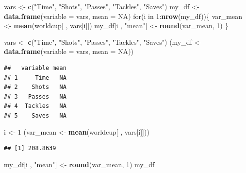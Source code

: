 \documentclass[]{book}
\makeatletter
\newenvironment{Shaded}{\begin{snugshade}}{\end{snugshade}}
\newcommand{\KeywordTok}[1]{\textcolor[rgb]{0.13,0.29,0.53}{\textbf{{#1}}}}
\newcommand{\DataTypeTok}[1]{\textcolor[rgb]{0.13,0.29,0.53}{{#1}}}
\newcommand{\DecValTok}[1]{\textcolor[rgb]{0.00,0.00,0.81}{{#1}}}
\newcommand{\StringTok}[1]{\textcolor[rgb]{0.31,0.60,0.02}{{#1}}}
\newcommand{\OtherTok}[1]{\textcolor[rgb]{0.56,0.35,0.01}{{#1}}}
\newcommand{\NormalTok}[1]{{#1}}
\newenvironment{kframe}{%
\medskip{}
\setlength{\fboxsep}{.8em}
 \def\at@end@of@kframe{}%
 \ifinner\ifhmode%
  \def\at@end@of@kframe{\end{minipage}}%
  \begin{minipage}{\columnwidth}%
 \fi\fi%
 \def\FrameCommand##1{\hskip\@totalleftmargin \hskip-\fboxsep
 \colorbox{shadecolor}{##1}\hskip-\fboxsep
     \hskip-\linewidth \hskip-\@totalleftmargin \hskip\columnwidth}%
 \MakeFramed {\advance\hsize-\width
   \@totalleftmargin\z@ \linewidth\hsize
   \@setminipage}}%
 {\par\unskip\endMakeFramed%
 \at@end@of@kframe}
\renewenvironment{Shaded}{\begin{kframe}}{\end{kframe}}
\makeatother
\begin{document}
\begin{Shaded}
\begin{Highlighting}[]
\NormalTok{vars <-}\StringTok{ }\KeywordTok{c}\NormalTok{(}\StringTok{"Time"}\NormalTok{, }\StringTok{"Shots"}\NormalTok{, }\StringTok{"Passes"}\NormalTok{, }\StringTok{"Tackles"}\NormalTok{, }\StringTok{"Saves"}\NormalTok{)}
\NormalTok{my_df <-}\StringTok{ }\KeywordTok{data.frame}\NormalTok{(}\DataTypeTok{variable =} \NormalTok{vars, }\DataTypeTok{mean =} \OtherTok{NA}\NormalTok{)}
\NormalTok{for(i in }\DecValTok{1}\NormalTok{:}\KeywordTok{nrow}\NormalTok{(my_df))\{}
        \NormalTok{var_mean <-}\StringTok{ }\KeywordTok{mean}\NormalTok{(worldcup[ , vars[i]])}
        \NormalTok{my_df[i , }\StringTok{"mean"}\NormalTok{] <-}\StringTok{ }\KeywordTok{round}\NormalTok{(var_mean, }\DecValTok{1}\NormalTok{)}
\NormalTok{\}}
\end{Highlighting}
\end{Shaded}

\begin{Shaded}
\begin{Highlighting}[]
\NormalTok{vars <-}\StringTok{ }\KeywordTok{c}\NormalTok{(}\StringTok{"Time"}\NormalTok{, }\StringTok{"Shots"}\NormalTok{, }\StringTok{"Passes"}\NormalTok{, }\StringTok{"Tackles"}\NormalTok{, }\StringTok{"Saves"}\NormalTok{)}
\NormalTok{(my_df <-}\StringTok{ }\KeywordTok{data.frame}\NormalTok{(}\DataTypeTok{variable =} \NormalTok{vars, }\DataTypeTok{mean =} \OtherTok{NA}\NormalTok{))}
\end{Highlighting}
\end{Shaded}

\begin{verbatim}
##   variable mean
## 1     Time   NA
## 2    Shots   NA
## 3   Passes   NA
## 4  Tackles   NA
## 5    Saves   NA
\end{verbatim}

\begin{Shaded}
\begin{Highlighting}[]
\NormalTok{i <-}\StringTok{ }\DecValTok{1}
\NormalTok{(var_mean <-}\StringTok{ }\KeywordTok{mean}\NormalTok{(worldcup[ , vars[i]]))}
\end{Highlighting}
\end{Shaded}

\begin{verbatim}
## [1] 208.8639
\end{verbatim}

\begin{Shaded}
\begin{Highlighting}[]
\NormalTok{my_df[i , }\StringTok{"mean"}\NormalTok{] <-}\StringTok{ }\KeywordTok{round}\NormalTok{(var_mean, }\DecValTok{1}\NormalTok{)}
\NormalTok{my_df}
\end{Highlighting}
\end{Shaded}
\end{document}
